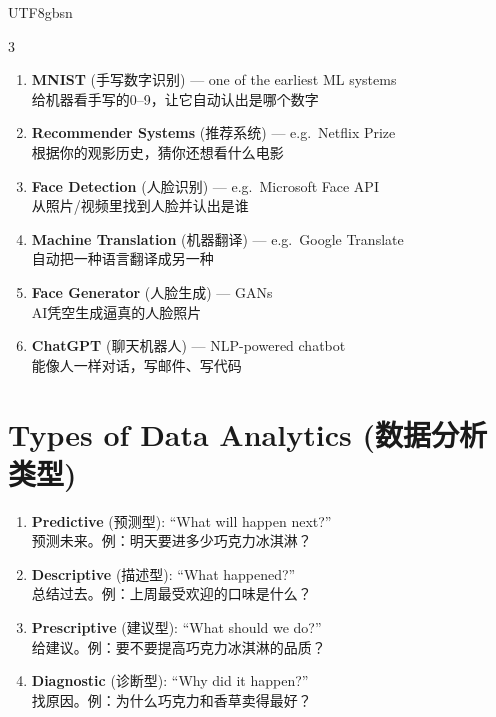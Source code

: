 \documentclass[10pt,landscape,a4paper]{article}
\newcommand{\zhint}[1]{{\scriptsize\color{gray!70!black}#1}}
\begin{document}
\begin{CJK}{UTF8}{gbsn}
\begin{multicols}{3}
\begin{enumerate}[leftmargin=*, nosep, itemsep=1pt]
    \item \textbf{MNIST} \zhint{(手写数字识别)} --- one of the earliest ML systems\\
    \zhint{给机器看手写的0--9，让它自动认出是哪个数字}
    \item \textbf{Recommender Systems} \zhint{(推荐系统)} --- e.g.\ Netflix Prize\\
    \zhint{根据你的观影历史，猜你还想看什么电影}
    \item \textbf{Face Detection} \zhint{(人脸识别)} --- e.g.\ Microsoft Face API\\
    \zhint{从照片/视频里找到人脸并认出是谁}
    \item \textbf{Machine Translation} \zhint{(机器翻译)} --- e.g.\ Google Translate\\
    \zhint{自动把一种语言翻译成另一种}
    \item \textbf{Face Generator} \zhint{(人脸生成)} --- GANs\\
    \zhint{AI凭空生成逼真的人脸照片}
    \item \textbf{ChatGPT} \zhint{(聊天机器人)} --- NLP-powered chatbot\\
    \zhint{能像人一样对话，写邮件、写代码}
\end{enumerate}

\section{Types of Data Analytics \zhint{(数据分析类型)}}

\begin{enumerate}[leftmargin=*, nosep, itemsep=1pt]
    \item \textbf{Predictive} \zhint{(预测型)}: ``What will happen next?''\\
    \zhint{预测未来。例：明天要进多少巧克力冰淇淋？}
    \item \textbf{Descriptive} \zhint{(描述型)}: ``What happened?''\\
    \zhint{总结过去。例：上周最受欢迎的口味是什么？}
    \item \textbf{Prescriptive} \zhint{(建议型)}: ``What should we do?''\\
    \zhint{给建议。例：要不要提高巧克力冰淇淋的品质？}
    \item \textbf{Diagnostic} \zhint{(诊断型)}: ``Why did it happen?''\\
    \zhint{找原因。例：为什么巧克力和香草卖得最好？}
\end{enumerate}


\end{multicols}
\end{CJK}
\end{document}
